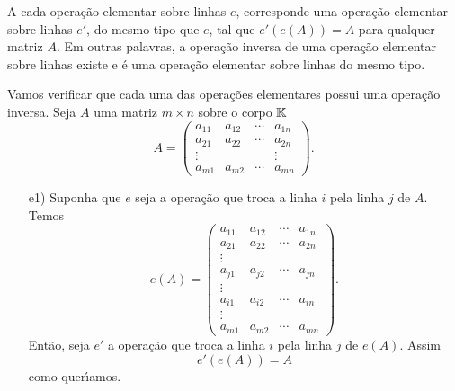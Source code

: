 \begin{teorema}
A cada opera\c{c}\~ao elementar sobre linhas $e$, corresponde uma opera\c{c}\~ao elementar sobre linhas $e'$, do mesmo tipo que $e$, tal que $e'(e(A)) = A$ para qualquer matriz $A$. Em outras palavras, a opera\c{c}\~ao inversa de uma opera\c{c}\~ao elementar sobre linhas existe e \'e uma opera\c{c}\~ao elementar sobre linhas do mesmo tipo.
\end{teorema}
\begin{prova}
Vamos verificar que cada uma das opera\c{c}\~oes elementares possui uma opera\c{c}\~ao inversa. Seja $A$ uma matriz $m \times n$ sobre o corpo $\mathbb{K}$
\[
A = \begin{pmatrix}
a_{11} & a_{12} & \cdots & a_{1n}\\
a_{21} & a_{22} & \cdots & a_{2n}\\
\vdots & & & \vdots\\
a_{m1} & a_{m2} & \cdots & a_{mn}
\end{pmatrix}.
\]
\begin{enumerate}
	\item [e1)] Suponha que $e$ seja a opera\c{c}\~ao que troca a linha $i$ pela linha $j$ de $A$. Temos
	\[
	e(A) = 
	\begin{pmatrix}
	a_{11} & a_{12} & \cdots & a_{1n}\\
	a_{21} & a_{22} & \cdots & a_{2n}\\
	\vdots\\
	a_{j1} & a_{j2} & \cdots & a_{jn}\\
	\vdots\\
	a_{i1} & a_{i2} & \cdots & a_{in}\\
	\vdots\\
	a_{m1} & a_{m2} & \cdots & a_{mn}
	\end{pmatrix}.
	\]
	Ent\~ao, seja $e'$ a opera\c{c}\~ao que troca a linha $i$ pela linha $j$ de $e(A)$. Assim
	\[
	e'(e(A)) = A
	\]
	como quer{\'\i}amos.


\end{enumerate}
\end{prova}
